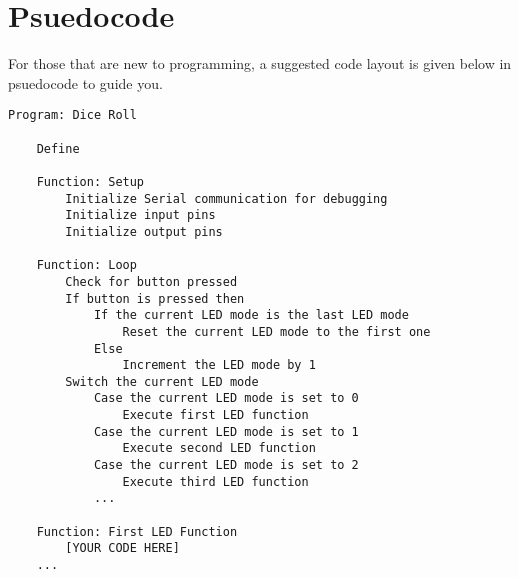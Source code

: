 \documentclass[
	letterpaper, %
	fontsize=10pt, %
	twoside=true, %
	numbers=noenddot, %
]{kaobook}
\begin{document}
\section*{Psuedocode}
For those that are new to programming, a suggested code layout is given below in psuedocode to guide you.

\begin{lstlisting}[style=kaolstplain, linewidth=1.5\textwidth]
    Program: Dice Roll
    
    Define 

    Function: Setup
        Initialize Serial communication for debugging
        Initialize input pins
        Initialize output pins
    
    Function: Loop
        Check for button pressed
        If button is pressed then
            If the current LED mode is the last LED mode
                Reset the current LED mode to the first one
            Else
                Increment the LED mode by 1
        Switch the current LED mode
            Case the current LED mode is set to 0
                Execute first LED function
            Case the current LED mode is set to 1
                Execute second LED function
            Case the current LED mode is set to 2
                Execute third LED function
            ...
    
    Function: First LED Function
        [YOUR CODE HERE]
    ...
    
    \end{lstlisting}
\end{document}
